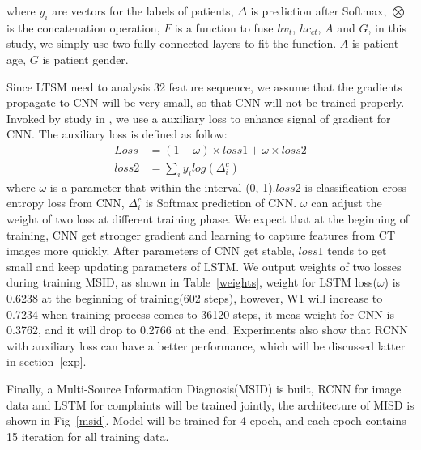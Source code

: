 \documentclass[runningheads]{llncs}
\begin{document}
where $y_i$ are vectors for the labels of patients, $\Delta$ is prediction after Softmax, $\bigotimes$ is the concatenation operation, $F$ is a function to fuse $hv_t$, $hc_{ct}$, $A$ and $G$, in this study, we simply use two fully-connected layers to fit the function. $A$ is patient age, $G$ is patient gender.

Since LTSM need to analysis 32 feature sequence, we assume that the gradients propagate to CNN will be very small, so that CNN will not be trained properly. Invoked by study in \cite{szegedy2016rethinking}, we use a auxiliary loss to enhance signal of gradient for CNN.
The auxiliary loss is defined as follow: 
\begin{align*}
Loss &=  (1 - \omega) \times loss1 +  \omega \times loss2 \\
loss2 &= \sum_i{y_i log(\Delta^c_i)}
\end{align*}
where $\omega$ is a parameter that within the interval (0, 1).$loss2$ is classification cross-entropy loss from CNN, $\Delta^c_i$ is Softmax prediction of CNN. $\omega$ can adjust the weight of two loss at different training phase.
We expect that at the beginning of training, CNN get stronger gradient and learning to capture features from CT images more quickly. After parameters of CNN get stable, $ loss1$ tends to get small and keep updating parameters of LSTM. We output weights of two losses during training MSID, as shown in Table~\ref{weights}, weight for LSTM loss($\omega$) is 0.6238 at the beginning of training(602 steps), however, W1 will increase to 0.7234 when training process comes to 36120 steps, it meas weight for CNN is 0.3762, and it will drop to 0.2766 at the end. Experiments also show that RCNN with auxiliary loss can have a better performance, which will be discussed latter in section~\ref{exp}.

Finally, a Multi-Source Information Diagnosis(MSID) is built, RCNN for image data and LSTM for complaints will be trained jointly, the architecture of MISD is shown in Fig~\ref{msid}. Model will be trained for 4 epoch, and each epoch contains 15 iteration for all training data.
\end{document}
